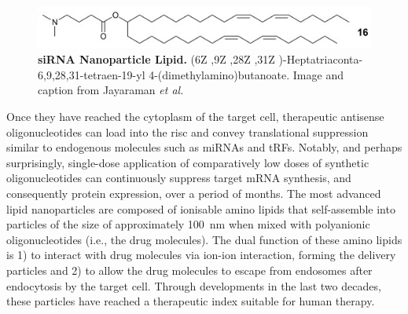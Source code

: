 \begin{figure}
\centering
\includegraphics[width=.7\textwidth]{figures/mfig004}
\caption[siRNA Nanoparticle Lipid.]{\textbf{siRNA Nanoparticle Lipid.} (6Z ,9Z ,28Z ,31Z )-Heptatriaconta-6,9,28,31-tetraen-19-yl 4-(dimethylamino)butanoate. Image and caption from Jayaraman \emph{et al.}\cite{Jayaraman2012}
\label{fig:lipid}}
\end{figure}

Once they have reached the cytoplasm of the target cell, therapeutic antisense oligonucleotides can load into the \acf{risc} and convey translational suppression similar to endogenous molecules such as miRNAs and tRFs. Notably, and perhaps surprisingly, single-dose application of comparatively low doses of synthetic oligonucleotides can continuously suppress target mRNA synthesis, and consequently protein expression, over a period of months.\cite{Raal2020} The most advanced lipid nanoparticles are composed of ionisable amino lipids that self-assemble into particles of the size of approximately \SI{100}{\nano\metre} when mixed with polyanionic oligonucleotides (i.e., the drug molecules).\cite{Akhtar2007} The dual function of these amino lipids is 1) to interact with drug molecules via ion-ion interaction, forming the delivery particles and 2) to allow the drug molecules to escape from endosomes after endocytosis by the target cell. Through developments in the last two decades, these particles have reached a therapeutic index suitable for human therapy.\cite{Jayaraman2012, Raal2020}

